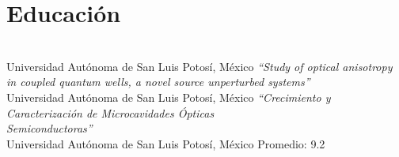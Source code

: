 \documentclass[letterpaper]{twentysecondcv} %
\begin{document}

\aboutme{} %







\makeprofile %



\section{Educaci\'on}

\begin{twenty} %
	                       {\\Universidad Aut\'onoma de San Luis Potos\'i, M\'exico}
	                       {\emph{``Study of optical anisotropy in coupled quantum wells, a novel source unperturbed systems''}}
	                      {\\Universidad Aut\'onoma de San Luis Potos\'i, M\'exico}
	                      {\emph{``Crecimiento y Caracterizaci\'on de Microcavidades \'Opticas \\ Semiconductoras''}}
	                      {\\Universidad Aut\'onoma de San Luis Potos\'i, M\'exico}
	                      {Promedio: 9.2}
	
\end{twenty}
\end{document}
